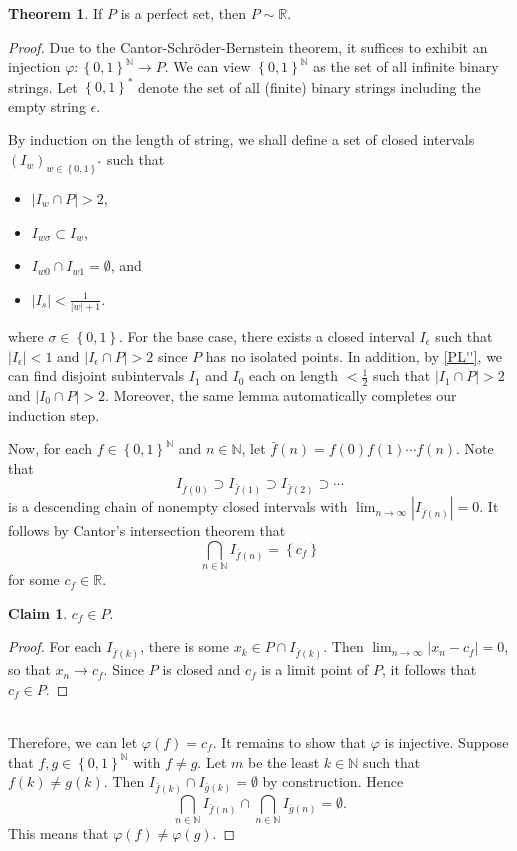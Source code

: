 \documentclass[10pt,letterpaper,cm]{nupset}
\theoremstyle{definition}
\theoremstyle{theorem}
\newtheorem{theorem}[definition]{Theorem}
\newtheorem*{claim}{Claim}
\theoremstyle{remark}
\newcommand{\N}{\mathbb N}
\newcommand{\R}{\mathbb R}
\newcommand{\1}{\mathbf{1}}
\newcommand{\0}{\vec 0}
\begin{document}
\begin{theorem}
If $P$ is a perfect set, then $P \sim \R$.
\end{theorem}
\begin{proof}
Due to  the Cantor-Schr\"oder-Bernstein theorem, it suffices to exhibit an injection $\varphi : \left\{0, 1\right\}^{\N} \to P$. We can view $ \left\{0, 1\right\}^{\N}$ as the set of all infinite binary strings. Let $\left\{0, 1\right\}^{\ast}$ denote the set of all (finite) binary strings including the empty string $\epsilon$. 

\smallskip

By induction on the length of string, we shall define a set of closed intervals $\left(I_w\right)_{w\in \left\{0, 1\right\}^{\ast}}$ such that
\begin{itemize}
\item $\left\lvert{I_w \cap P}\right\rvert >2$,
\item $I_{w\sigma}\subset I_w$,
\item $I_{w0} \cap I_{w1} = \emptyset$, and
\item $\left\lvert{I_s}\right\rvert < \frac{1}{\left\lvert{w}\right\rvert+1}$.
\end{itemize}
where $\sigma \in \left\{0, 1\right\}$. For the base case, there exists a closed interval $I_{\epsilon}$ such that $\left\lvert{I_{\epsilon}}\right\rvert < 1$ and $\left\lvert{I_{\epsilon}\cap P}\right\rvert >2$ since $P$ has no isolated points. In addition, by \cref{PL''}, we can find disjoint subintervals $I_1$ and $I_0$ each on length $< \frac{1}{2}$ such that $\left\lvert{I_1 \cap P}\right\rvert>2$ and $\left\lvert{I_0 \cap P}\right\rvert >2$. Moreover, the same lemma automatically completes our induction step. 

\smallskip

 Now, for each $f\in \left\{0, 1\right\}^{\N}$ and $n\in \N$, let $\bar{f}(n) = f(0)f(1)\cdots f(n)  $. Note that $$I_{\bar{f}(0)}\supset  I_{\bar{f}(1)} \supset I_{\bar{f}(2)} \supset \cdots $$  is a descending chain of nonempty closed intervals with $\lim_{n\to \infty} \left\lvert{I_{\bar{f}(n)}}\right\rvert =0$. It follows by  Cantor's intersection theorem  that $$\bigcap_{n \in \N} I_{\bar{f}(n)} = \left\{c_f\right\}$$ for some $c_f \in \R$. 
\begin{claim}
$c_f \in P$. 
\end{claim}
\begin{proof}
For each $I_{\bar{f}(k)}$, there is some $x_k \in P \cap I_{\bar{f}(k)}$. Then $\lim_{n\to \infty} \left\lvert{x_n - c_f}\right\rvert = 0$, so that $x_n \to c_f$. Since $P$ is closed and $c_f$ is a limit point of $P$, it follows that $c_f \in P$. 
\end{proof}$ $
\\Therefore, we can let $\varphi(f) = c_f$. It remains to show that $\varphi$ is injective. Suppose that $f, g \in \left\{0, 1\right\}^{\N}$ with $f \ne g$.  Let $m$ be the least $k \in \N$ such that $f(k) \ne g(k)$. Then $I_{\bar{f}(k)} \cap I_{\bar{g}(k)} = \emptyset$ by construction. Hence $$\bigcap_{n \in \N} I_{\bar{f}(n)} \cap \bigcap_{n \in \N} I_{\bar{g}(n)} = \emptyset .$$ This means that $\varphi(f) \ne \varphi(g)$.
\end{proof}
\end{document}
